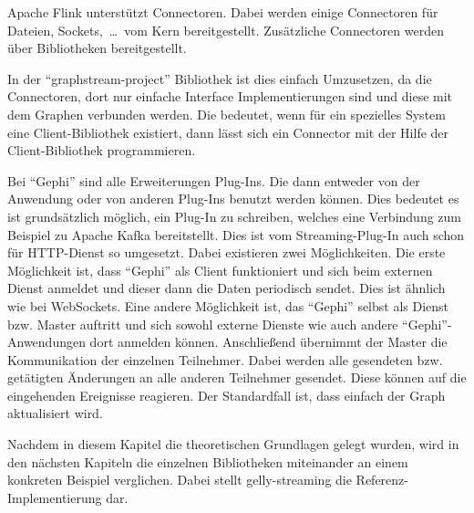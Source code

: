 Apache Flink unterstützt Connectoren. Dabei werden einige Connectoren
für Dateien, Sockets,~\dots~vom Kern bereitgestellt. Zusätzliche Connectoren
werden über Bibliotheken bereitgestellt.

In der \enquote{graphstream-project} Bibliothek ist dies einfach Umzusetzen, da
die Connectoren, dort nur einfache Interface Implementierungen sind und diese
mit dem Graphen verbunden werden. Die bedeutet, wenn für ein spezielles
System eine Client-Bibliothek existiert, dann lässt sich ein Connector mit der
Hilfe der Client-Bibliothek programmieren.

Bei \enquote{Gephi} sind alle Erweiterungen Plug-Ins. Die dann entweder von der
Anwendung oder von anderen Plug-Ins benutzt werden können. Dies bedeutet es ist
grundsätzlich möglich, ein Plug-In zu schreiben, welches eine Verbindung zum
Beispiel zu Apache Kafka bereitstellt. Dies ist vom Streaming-Plug-In auch schon
für HTTP-Dienst so umgesetzt. Dabei existieren zwei Möglichkeiten. Die erste
Möglichkeit ist, dass \enquote{Gephi} als Client funktioniert und sich beim
externen Dienst anmeldet und dieser dann die Daten periodisch sendet. Dies ist
ähnlich wie bei WebSockets. Eine andere Möglichkeit ist, das \enquote{Gephi}
selbst als Dienst bzw. Master auftritt und sich sowohl externe Dienste wie auch
andere \enquote{Gephi}-Anwendungen dort anmelden können. Anschließend übernimmt
der Master die Kommunikation der einzelnen Teilnehmer. Dabei werden alle gesendeten
bzw. getätigten Änderungen an alle anderen Teilnehmer gesendet. Diese können
auf die eingehenden Ereignisse reagieren. Der Standardfall ist, dass einfach der
Graph aktualisiert wird.

Nachdem in diesem Kapitel die theoretischen Grundlagen gelegt wurden, wird in den
nächsten Kapiteln die einzelnen Bibliotheken miteinander an einem konkreten Beispiel
verglichen. Dabei stellt gelly-streaming die Referenz-Implementierung dar.
